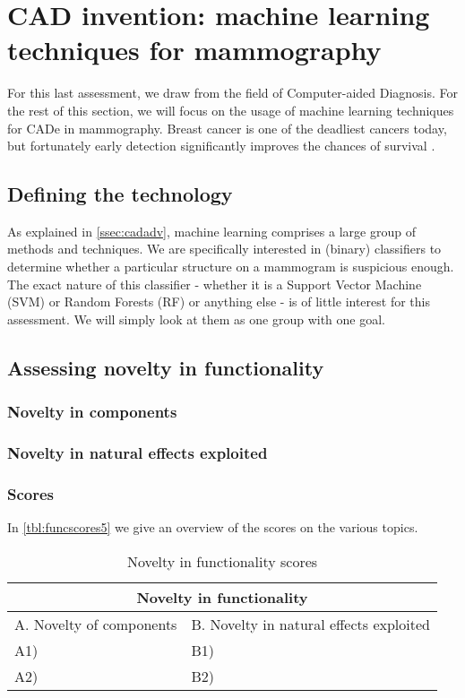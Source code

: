 \section{CAD invention: machine learning techniques for mammography}
For this last assessment, we draw from the field of Computer-aided Diagnosis.
For the rest of this section, we will focus on the usage of machine learning
techniques for CADe in mammography. Breast cancer is one of the deadliest
cancers today, but fortunately early detection significantly improves the
chances of survival \cite{mammoairecent}.


\subsection{Defining the technology}
As explained in \autoref{ssec:cadadv}, machine learning comprises a large group
of methods and techniques. We are specifically interested in (binary)
classifiers to determine whether a particular structure on a mammogram is
suspicious enough. The exact nature of this classifier - whether it is a Support
Vector Machine (SVM) or Random Forests (RF) or anything else - is of little
interest for this assessment. We will simply look at them as one group with one goal.

\subsection{Assessing novelty in functionality}

\subsubsection{Novelty in components}

\subsubsection{Novelty in natural effects exploited}

\subsubsection{Scores}
In \autoref{tbl:funcscores5} we give an overview of the scores on the various
topics.

\begin{table}[h]
\centering
\begin{tabular}{l l}
\hline
\multicolumn{2}{|c|}{Novelty in functionality} \\
\hline
A. Novelty of components & B. Novelty in natural effects exploited\\
A1) & B1)\\ 
A2) & B2)\\ 
\hline
\end{tabular}
\caption{Novelty in functionality scores}
\label{tbl:funcscores5}
\end{table}

